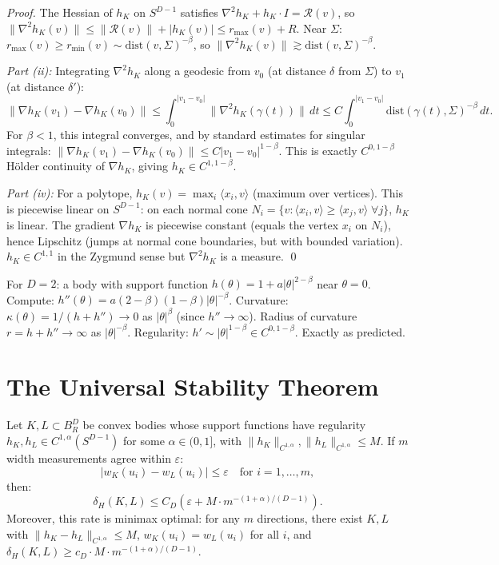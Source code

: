 \begin{proof}
The Hessian of $h_K$ on $S^{D-1}$ satisfies $\nabla^2 h_K + h_K \cdot I = \mathcal{R}(v)$, so $\|\nabla^2 h_K(v)\| \leq \|\mathcal{R}(v)\| + |h_K(v)| \leq r_{\max}(v) + R$. Near $\Sigma$: $r_{\max}(v) \geq r_{\min}(v) \sim \mathrm{dist}(v,\Sigma)^{-\beta}$, so $\|\nabla^2 h_K(v)\| \gtrsim \mathrm{dist}(v, \Sigma)^{-\beta}$.

\emph{Part (ii):} Integrating $\nabla^2 h_K$ along a geodesic from $v_0$ (at distance $\delta$ from $\Sigma$) to $v_1$ (at distance $\delta'$):
\[
  \|\nabla h_K(v_1) - \nabla h_K(v_0)\| \leq \int_0^{|v_1 - v_0|} \|\nabla^2 h_K(\gamma(t))\| \, dt \leq C \int_0^{|v_1 - v_0|} \mathrm{dist}(\gamma(t), \Sigma)^{-\beta} \, dt.
\]
For $\beta < 1$, this integral converges, and by standard estimates for singular integrals: $\|\nabla h_K(v_1) - \nabla h_K(v_0)\| \leq C |v_1 - v_0|^{1-\beta}$. This is exactly $C^{0, 1-\beta}$ H\"older continuity of $\nabla h_K$, giving $h_K \in C^{1, 1-\beta}$.

\emph{Part (iv):} For a polytope, $h_K(v) = \max_i \langle x_i, v \rangle$ (maximum over vertices). This is piecewise linear on $S^{D-1}$: on each normal cone $N_i = \{v : \langle x_i, v \rangle \geq \langle x_j, v \rangle \; \forall j\}$, $h_K$ is linear. The gradient $\nabla h_K$ is piecewise constant (equals the vertex $x_i$ on $N_i$), hence Lipschitz (jumps at normal cone boundaries, but with bounded variation). $h_K \in C^{1,1}$ in the Zygmund sense but $\nabla^2 h_K$ is a measure. \qed
\end{proof}

\begin{remark}
For $D = 2$: a body with support function $h(\theta) = 1 + a|\theta|^{2-\beta}$ near $\theta = 0$. Compute: $h''(\theta) = a(2-\beta)(1-\beta)|\theta|^{-\beta}$. Curvature: $\kappa(\theta) = 1/(h + h'') \to 0$ as $|\theta|^{\beta}$ (since $h'' \to \infty$). Radius of curvature $r = h + h'' \to \infty$ as $|\theta|^{-\beta}$. Regularity: $h' \sim |\theta|^{1-\beta} \in C^{0,1-\beta}$. Exactly as predicted.
\end{remark}


\section{The Universal Stability Theorem}

\begin{theorem}
\label{thm:universal}
Let $K, L \subset B_R^D$ be convex bodies whose support functions have regularity $h_K, h_L \in C^{1,\alpha}(S^{D-1})$ for some $\alpha \in (0, 1]$, with $\|h_K\|_{C^{1,\alpha}}, \|h_L\|_{C^{1,\alpha}} \leq M$. If $m$ width measurements agree within $\varepsilon$:
\[
  |w_K(u_i) - w_L(u_i)| \leq \varepsilon \quad \text{for } i = 1, \ldots, m,
\]
then:
\[
  \boxed{\delta_H(K, L) \leq C_D\!\left(\varepsilon + M \cdot m^{-(1+\alpha)/(D-1)}\right).}
\]
Moreover, this rate is minimax optimal: for any $m$ directions, there exist $K, L$ with $\|h_K - h_L\|_{C^{1,\alpha}} \leq M$, $w_K(u_i) = w_L(u_i)$ for all $i$, and $\delta_H(K, L) \geq c_D \cdot M \cdot m^{-(1+\alpha)/(D-1)}$.
\end{theorem}

